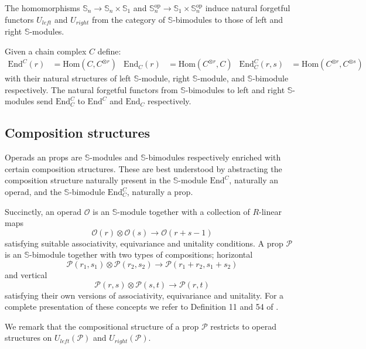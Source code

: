 \documentclass{amsart}
\renewcommand{\S}{\mathbb{S}}
\newcommand{\End}{\mathrm{End}}
\newcommand{\Hom}{\mathrm{Hom}}
\newcommand{\op}{\mathrm{op}}
\newcommand{\Uleft}{U_{left}}
\newcommand{\Uright}{U_{right}}
\begin{document}
The homomorphisms $\S_n \to \S_n \times \S_1$ and $\S_n^\op \to \S_1 \times \S_n^\op$ induce natural forgetful functors $\Uleft$ and $\Uright$ from the category of $\S$-bimodules to those of left and right $\S$-modules.

Given a chain complex $C$ define:
\begin{align*}
\End^C(r) &= \Hom(C, C^{\otimes r})
& \End_C(r) &= \Hom(C^{\otimes r}, C)
&\End^C_C(r, s) &= \Hom(C^{\otimes r}, C^{\otimes s})
\end{align*}
with their natural structures of left $\S$-module, right $\S$-module, and $\S$-bimodule respectively.
The natural forgetful functors from $\S$-bimodules to left and right $\S$-modules send $\End^C_C$ to $\End^C$ and $\End_C$ respectively.

\subsection{Composition structures}

Operads an props are $\S$-modules and \mbox{$\S$-bimodules} respectively enriched with certain composition structures. These are best understood by abstracting the composition structure naturally present in the $\S$-module $\End^C$, naturally an operad, and the $\S$-bimodule $\End^C_C$, naturally a prop.

Succinctly, an operad $\mathcal O$ is an $\S$-module together with a collection of $R$-linear maps
\begin{equation*}
\mathcal O(r) \otimes \mathcal O(s) \to \mathcal O(r+s-1)
\end{equation*}
satisfying suitable associativity, equivariance and unitality conditions.
A prop $\mathcal P$ is an $\S$-bimodule together with two types of compositions; horizontal
\begin{equation*}
\mathcal P(r_1, s_1) \otimes \mathcal P(r_2, s_2) \to \mathcal P(r_1 + r_2, s_1 + s_2)
\end{equation*}
and vertical
\begin{equation*}
\mathcal P(r,s) \otimes \mathcal P(s, t) \to \mathcal P(r, t)
\end{equation*}
satisfying their own versions of associativity, equivariance and unitality.
For a complete presentation of these concepts we refer to Definition 11 and 54 of \cite{Markl08}.

We remark that the compositional structure of a prop $\mathcal P$ restricts to operad structures on $\Uleft(\mathcal P)$ and $\Uright(\mathcal P)$.
\end{document}

